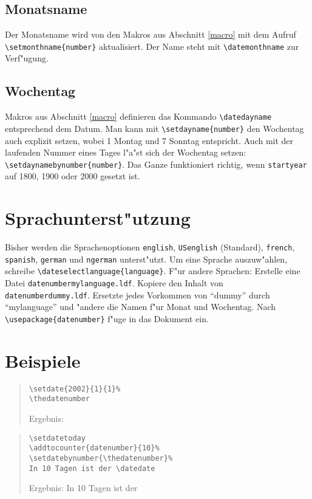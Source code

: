 \documentclass[a4paper,draft]{article}
\begin{document}
\subsection{Monatsname\label{monthname}}
Der Monatsname wird von den  Makros aus Abschnitt \ref{macro} mit dem Aufruf \verb+\setmonthname{number}+ aktualisiert. Der Name steht mit \verb+\datemonthname+ zur Verf"ugung.

\subsection{Wochentag\label{dayname}}
Makros aus Abschnitt \ref{macro} definieren das Kommando \verb+\datedayname+ entsprechend dem Datum. Man kann mit \verb+\setdayname{number}+ den Wochentag auch explizit setzen, wobei 1 Montag und 7 Sonntag entspricht. Auch mit der laufenden Nummer eines Tages l"a"st sich der Wochentag setzen: \verb+\setdaynamebynumber{number}+. Das Ganze funktioniert richtig, wenn \texttt{startyear} auf 1800, 1900 oder 2000 gesetzt ist.

\section{Sprachunterst"utzung}\sloppypar
Bisher werden die Sprachenoptionen  \texttt{english}, \texttt{USenglish} (Standard), \texttt{french}, \texttt{spanish}, \texttt{german} und  \texttt{ngerman} unterst"utzt. Um eine Sprache auszuw"ahlen, schreibe \verb+\dateselectlanguage{language}+.
F"ur andere Sprachen: Erstelle eine Datei \texttt{datenumbermylanguage.ldf}. Kopiere den Inhalt von \texttt{datenumberdummy.ldf}. Ersetzte jedes Vorkommen von "`dummy"'  durch "`mylanguage"' und "andere die Namen f"ur Monat und Wochentag. Nach \verb+\usepackage{datenumber}+ f"uge \verb++ in das Dokument ein.

\section{Beispiele}
\begin{quote}
\begin{verbatim}
\setdate{2002}{1}{1}%
\thedatenumber
\end{verbatim}
%
Ergebnis: \thedatenumber
\end{quote}\vspace{\baselineskip}

\begin{quote}
\begin{verbatim}
\setdatetoday
\addtocounter{datenumber}{10}%
\setdatebynumber{\thedatenumber}%
In 10 Tagen ist der \datedate
\end{verbatim}
\setdatetoday
\addtocounter{datenumber}{10}%
\setdatebynumber{\thedatenumber}%
Ergebnis: In 10 Tagen ist der \datedate
\end{quote}\vspace{\baselineskip}
\end{document}
